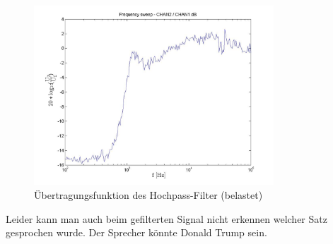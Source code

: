 \documentclass[a4paper]{article}
\begin{document}
\begin{figure}[H]
    \centering
    \includegraphics[width=0.8\textwidth]{versuch5/versuch5_belastet.jpg}
    \caption{Übertragungsfunktion des Hochpass-Filter (belastet)}
    \label{fig:versuch5-belastet}
\end{figure}

\noindent Leider kann man auch beim gefilterten Signal nicht erkennen welcher Satz gesprochen wurde. Der Sprecher könnte Donald Trump sein.
\end{document}
